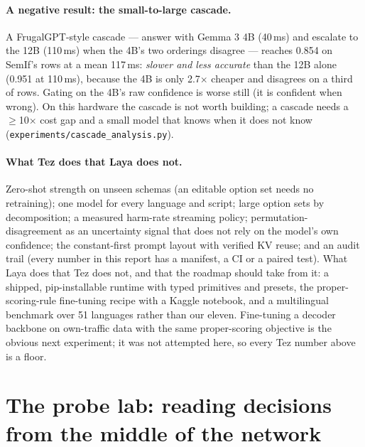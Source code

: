 \documentclass[11pt,a4paper]{article}
\newcommand{\code}[1]{\texttt{#1}}
\begin{document}
\paragraph{A negative result: the small-to-large cascade.} A FrugalGPT-style cascade --- answer with Gemma 3 4B (40\,ms) and escalate to the 12B (110\,ms) when the 4B's two orderings disagree --- reaches 0.854 on SemIf's rows at a mean 117\,ms: \emph{slower and less accurate} than the 12B alone (0.951 at 110\,ms), because the 4B is only 2.7$\times$ cheaper and disagrees on a third of rows. Gating on the 4B's raw confidence is worse still (it is confident when wrong). On this hardware the cascade is not worth building; a cascade needs a $\ge$10$\times$ cost gap and a small model that knows when it does not know (\code{experiments/cascade\_analysis.py}).

\paragraph{What Tez does that Laya does not.} Zero-shot strength on unseen schemas (an editable option set needs no retraining); one model for every language and script; large option sets by decomposition; a measured harm-rate streaming policy; permutation-disagreement as an uncertainty signal that does not rely on the model's own confidence; the constant-first prompt layout with verified KV reuse; and an audit trail (every number in this report has a manifest, a CI or a paired test). What Laya does that Tez does not, and that the roadmap should take from it: a shipped, pip-installable runtime with typed primitives and presets, the proper-scoring-rule fine-tuning recipe with a Kaggle notebook, and a multilingual benchmark over 51 languages rather than our eleven. Fine-tuning a decoder backbone on own-traffic data with the same proper-scoring objective is the obvious next experiment; it was not attempted here, so every Tez number above is a floor.

\section{The probe lab: reading decisions from the middle of the network}
\label{sec:lab}
\end{document}
